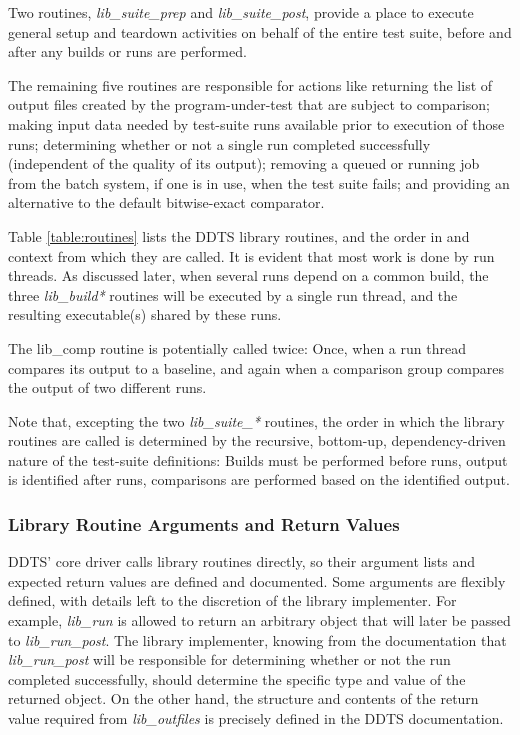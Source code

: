 \documentclass[conference]{IEEEtran}
\begin{document}
Two routines, \emph{lib\_suite\_prep} and \emph{lib\_suite\_post}, provide a place to execute general setup and teardown activities on behalf of the entire test suite, before and after any builds or runs are performed.

The remaining five routines are responsible for actions like returning the list of output files created by the program-under-test that are subject to comparison; making input data needed by test-suite runs available prior to execution of those runs; determining whether or not a single run completed successfully (independent of the quality of its output); removing a queued or running job from the batch system, if one is in use, when the test suite fails; and providing an alternative to the default bitwise-exact comparator.

Table \ref{table:routines} lists the DDTS library routines, and the order in and context from which they are called. It is evident that most work is done by run threads. As discussed later, when several runs depend on a common build, the three \emph{lib\_build*} routines will be executed by a single run thread, and the resulting executable(s) shared by these runs.

The lib\_comp routine is potentially called twice: Once, when a run thread compares its output to a baseline, and again when a comparison group compares the output of two different runs.

Note that, excepting the two \emph{lib\_suite\_*} routines, the order in which the library routines are called is determined by the recursive, bottom-up, dependency-driven nature of the test-suite definitions: Builds must be performed before runs, output is identified after runs, comparisons are performed based on the identified output.

\subsubsection{Library Routine Arguments and Return Values}

DDTS' core driver calls library routines directly, so their argument lists and expected return values are defined and documented. Some arguments are flexibly defined, with details left to the discretion of the library implementer. For example, \emph{lib\_run} is allowed to return an arbitrary object that will later be passed to \emph{lib\_run\_post}. The library implementer, knowing from the documentation that \emph{lib\_run\_post} will be responsible for determining whether or not the run completed successfully, should determine the specific type and value of the returned object. On the other hand, the structure and contents of the return value required from \emph{lib\_outfiles} is precisely defined in the DDTS documentation.
\end{document}
